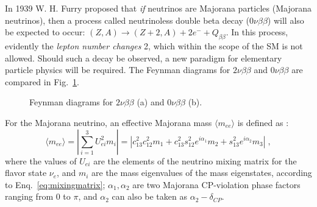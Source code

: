 In 1939 W. H. Furry \cite{furry1939transition} proposed that {\em if} neutrinos are Majorana particles (Majorana neutrinos), then a process called neutrinoless double beta decay ($0\nu\beta\beta$) will also be expected to occur: $(Z,A) \to (Z+2,A)+2e^{-}+Q_{\beta\beta}$. In this process, evidently the {\em lepton number changes} 2, which within the scope of the SM is not allowed. Should such a decay be observed, a new paradigm for elementary particle physics will be required. The Feynman diagrams for $2\nu\beta\beta$ and $0\nu\beta\beta$ are compared in Fig.~\ref{fig:feynman}.
\begin{figure}[htbp]
	\centering
	{
		\caption[Feynman diagrams for $2\nu\beta\beta$ and $0\nu\beta\beta$.]{Feynman diagrams for $2\nu\beta\beta$ (a) and $0\nu\beta\beta$ (b).\label{fig:feynman}}
	}
\end{figure}

For the Majorana neutrino, an effective Majorana mass $\langle m_{ee}\rangle$ is defined as \cite{suekane2015neutrino,zuber2020neutrino}:
\begin{equation}\label{eq:effective_nuMass}
\langle m_{ee}\rangle = |\sum_{i=1}^3 U^2_{ei}m_i|= |c^2_{13}c^2_{12}m_1+c^2_{13}s^2_{12}e^{i\alpha_1}m_2+s^2_{13}e^{i\alpha_2}m_3| \;,
\end{equation}
where the values of $U_{ei}$ are the elements of the neutrino mixing matrix for the flavor state $\nu_e$, and $m_i$ are the mass eigenvalues of the mass eigenstates, according to Enq.~\ref{eq:mixingmatrix}; $\alpha_1,\alpha_2$ are two Majorana CP-violation phase factors ranging from 0 to $\pi$, and $\alpha_2$ can also be taken as $\alpha_2-\delta_{CP}$.


